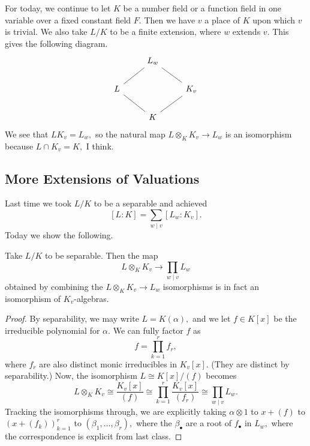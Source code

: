 












For today, we continue to let $K$ be a number field or a function field in one variable over a fixed constant field $F.$ Then we have $v$ a place of $K$ upon which $v$ is trivial. We also take $L/K$ to be a finite extension, where $w$ extends $v.$ This gives the following diagram.
\[\begin{tikzcd}
	& {L_w} \\
	L && {K_v} \\
	& K
	\arrow[no head, from=1-2, to=2-1]
	\arrow[no head, from=2-1, to=3-2]
	\arrow[no head, from=1-2, to=2-3]
	\arrow[no head, from=2-3, to=3-2]
\end{tikzcd}\]
We see that $LK_v=L_w,$ so the natural map $L\otimes_KK_v\to L_w$ is an isomorphism because $L\cap K_v=K,$ I think.\todo{}

\subsection{More Extensions of Valuations}
Last time we took $L/K$ to be a separable and achieved
\[[L:K]=\sum_{w\mid v}[L_w:K_v].\]
Today we show the following.
\begin{proposition}
	Take $L/K$ to be separable. Then the map
	\[L\otimes_KK_v\to\prod_{w\mid v}L_w\]
	obtained by combining the $L\otimes_KK_v\to L_w$ isomorphisms is in fact an isomorphism of $K_v$-algebras.
\end{proposition}
\begin{proof}
	By separability, we may write $L=K(\alpha),$ and we let $f\in K[x]$ be the irreducible polynomial for $\alpha.$ We can fully factor $f$ as
	\[f=\prod_{k=1}^rf_r,\]
	where $f_r$ are also distinct monic irreducibles in $K_v[x].$ (They are distinct by separability.) Now, the isomorphism $L\cong K[x]/(f)$ becomes
	\[L\otimes_KK_v\cong\frac{K_v[x]}{(f)}\cong\prod_{k=1}^r\frac{K_v[x]}{(f_r)}\cong\prod_{w\mid v}L_w.\]
	Tracking the isomorphisms through, we are explicitly taking $\alpha\otimes1$ to $x+(f)$ to $(x+(f_k))_{k=1}^r$ to $(\beta_1,\ldots,\beta_r),$ where the $\beta_\bullet$ are a root of $f_\bullet$ in $L_w,$ where the correspondence is explicit from last class.
\end{proof}

